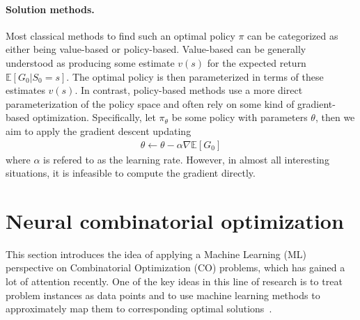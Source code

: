\documentclass[a4paper]{report}
\theoremstyle{definition}
\theoremstyle{plain}
\begin{document}
\paragraph{Solution methods.}
Most classical methods to find such an optimal policy $\pi$ can be categorized
as either being value-based or policy-based.
%
Value-based can be generally understood as producing some estimate $v(s)$ for
the expected return $\mathbb{E}[G_{0} | S_{0} = s]$. The optimal policy is then
parameterized in terms of these estimates $v(s)$.
%
In contrast, policy-based methods use a more direct parameterization of the
policy space and often rely on some kind of gradient-based optimization.
Specifically, let $\pi_{\theta}$ be some policy with parameters $\theta$, then we aim to
apply the gradient descent updating
\begin{align*}
  \theta \leftarrow \theta - \alpha \nabla \mathbb{E} [ G_{0} ]
\end{align*}
where $\alpha$ is refered to as the learning rate.
%
However, in almost all interesting situations, it is infeasible to compute the
gradient directly.

\section{Neural combinatorial optimization}


This section introduces the idea of applying a Machine Learning (ML) perspective
on Combinatorial Optimization (CO) problems, which has gained a lot of
attention recently. One of the key ideas in this line of research is to treat problem
instances as data points and to use machine learning methods to approximately
map them to corresponding optimal solutions~\cite{bengioMachineLearningCombinatorial2020}.

\end{document}
